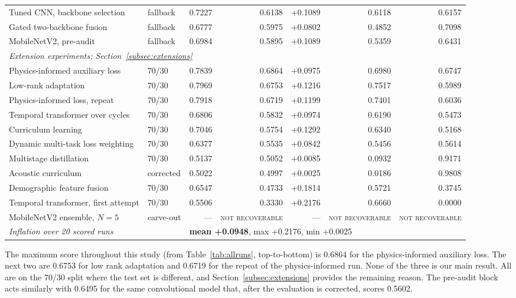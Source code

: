 \documentclass[journal,onecolumn]{IEEEtran}
\newcommand{\best}[1]{\textbf{#1}}
\newcommand{\notrec}{\textsc{not recoverable}}
\begin{document}
\begin{table}[hbtp]
\begin{tabular}{llrrrrr}
Tuned CNN, backbone selection & fallback & 0.7227 & 0.6138 & +0.1089 & 0.6118 & 0.6157 \\
Gated two-backbone fusion   & fallback & 0.6777 & 0.5975 & +0.0802 & 0.4852 & 0.7098 \\
MobileNetV2, pre-audit      & fallback & 0.6984 & 0.5895 & +0.1089 & 0.5359 & 0.6431 \\
\midrule
\multicolumn{7}{l}{\emph{Extension experiments; Section~\ref{subsec:extensions}}}\\
Physics-informed auxiliary loss & 70/30 & 0.7839 & 0.6864 & +0.0975 & 0.6980 & 0.6747 \\
Low-rank adaptation~\cite{hu2022lora} & 70/30 & 0.7969 & 0.6753 & +0.1216 & 0.7517 & 0.5989 \\
Physics-informed loss, repeat & 70/30 & 0.7918 & 0.6719 & +0.1199 & 0.7401 & 0.6036 \\
Temporal transformer over cycles & 70/30 & 0.6806 & 0.5832 & +0.0974 & 0.6190 & 0.5473 \\
Curriculum learning         & 70/30 & 0.7046 & 0.5754 & +0.1292 & 0.6340 & 0.5168 \\
Dynamic multi-task loss weighting & 70/30 & 0.6377 & 0.5535 & +0.0842 & 0.5456 & 0.5614 \\
Multistage distillation~\cite{pavel2024kd} & 70/30 & 0.5137 & 0.5052 & +0.0085 & 0.0932 & 0.9171 \\
Acoustic curriculum         & corrected & 0.5022 & 0.4997 & +0.0025 & 0.0186 & 0.9808 \\
Demographic feature fusion  & 70/30 & 0.6547 & 0.4733 & +0.1814 & 0.5721 & 0.3745 \\
Temporal transformer, first attempt & 70/30 & 0.5506 & 0.3330 & +0.2176 & 0.6660 & 0.0000 \\
MobileNetV2 ensemble, $N = 5$ & carve-out & --- & \notrec & --- & \notrec & \notrec \\
\midrule
\multicolumn{2}{l}{\emph{Inflation over 20 scored runs}} & \multicolumn{5}{l}{\best{mean +0.0948}, max +0.2176, min +0.0025} \\
\bottomrule
\end{tabular}

\vspace{2pt}
\footnotesize 
\end{table}
The maximum score throughout this study (from Table~\ref{tab:allruns}, top-to-bottom) is 0.6864 for the physics-informed auxiliary loss. The next two are 0.6753 for low rank adaptation and 0.6719 for the repeat of the physics-informed run. None of the three is our main result. All are on the 70/30 split where the test set is different, and Section~\ref{subsec:extensions} provides the remaining reason. The pre-audit block acts similarly with 0.6495 for the same convolutional model that, after the evaluation is corrected, scores 0.5602.
\end{document}
